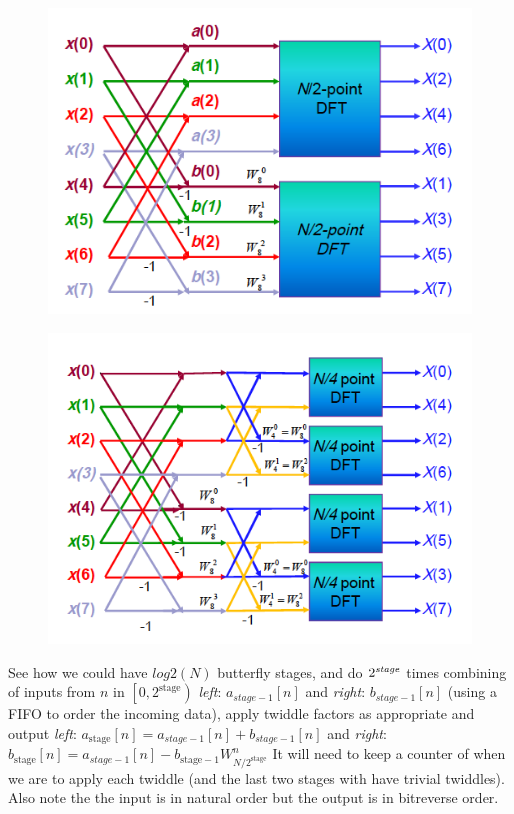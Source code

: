 \documentclass{article}
\begin{document}
\begin{figure}[h!]
  \begin{minipage}{0.5\textwidth}
    \centering
    \includegraphics[width=\linewidth]{dif_1.png}
      \label{fig:dif1}
  \end{minipage}
  \begin{minipage}{0.5\textwidth}
    \centering
    \includegraphics[width=\linewidth]{dif_2.png}
      \label{fig:dif2}
 \end{minipage}
\end {figure}

See how we could have $log2\left(N\right)$ butterfly stages, and do $2^{\emph{stage}}$ times combining of inputs from $n$ in $\left[0, 2^{\text{stage}}\right)$
\emph{left}: $a_{{stage}-1}\left[n\right]$
and \emph{right}: $b_{{stage}-1}\left[n\right]$
(using a FIFO to order the incoming data), apply twiddle factors as appropriate and output
\emph{left}: $a_{\text{stage}}\left[n\right] = a_{{stage}-1}\left[n\right] + b_{{stage}-1}\left[n\right] $
and \emph{right}: $b_{\text{stage}}\left[n\right] = a_{{stage}-1}\left[n\right] - b_{\text{stage}-1} W_{N/2^{\text{stage}}}^{n}$
It will need to keep a counter of when we are to apply each twiddle (and the last two stages with have trivial twiddles).
Also note the the input is in natural order but the output is in bitreverse order.
\end{document}
